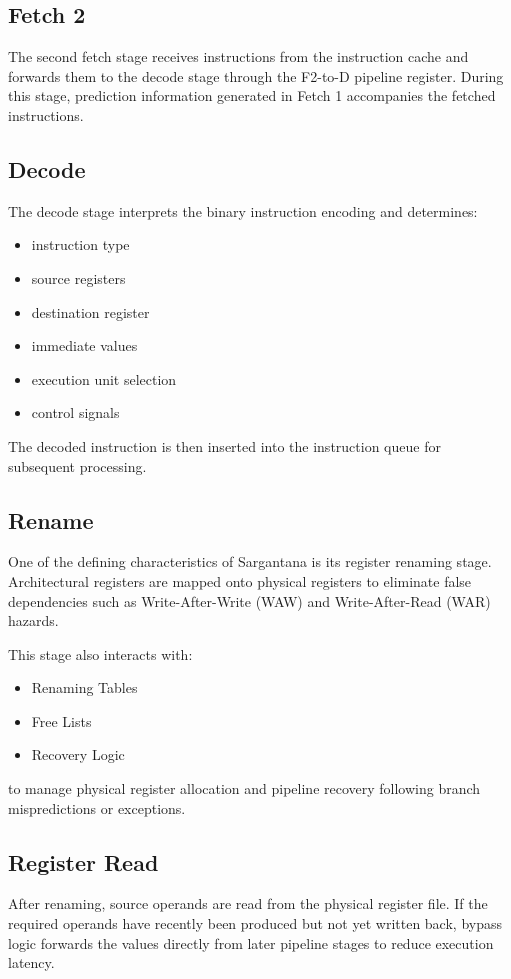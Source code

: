 \subsection*{Fetch 2}
The second fetch stage receives instructions from the instruction cache and forwards them to
the decode stage through the F2-to-D pipeline register. During this stage, prediction information
generated in Fetch 1 accompanies the fetched instructions.

\subsection*{Decode}
The decode stage interprets the binary instruction encoding and determines:
\begin{itemize}
  \item instruction type
  \item source registers
  \item destination register
  \item immediate values
  \item execution unit selection
  \item control signals
\end{itemize}
The decoded instruction is then inserted into the instruction queue for subsequent processing.

\subsection*{Rename}
One of the defining characteristics of Sargantana is its register renaming stage. Architectural
registers are mapped onto physical registers to eliminate false dependencies such as
Write-After-Write (WAW) and Write-After-Read (WAR) hazards.

This stage also interacts with:
\begin{itemize}
  \item Renaming Tables
  \item Free Lists
  \item Recovery Logic
\end{itemize}
to manage physical register allocation and pipeline recovery following branch mispredictions or
exceptions.

\subsection*{Register Read}
After renaming, source operands are read from the physical register file. If the required
operands have recently been produced but not yet written back, bypass logic forwards the
values directly from later pipeline stages to reduce execution latency.

